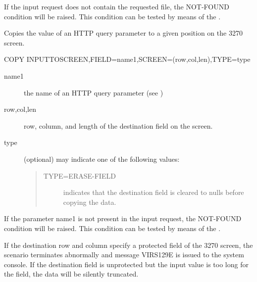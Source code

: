 \documentclass[letterpaper,10pt,english]{sphinxmanual}
\begin{document}
If the input request does not contain the requested file, the NOT-FOUND condition will be raised. This condition can be tested by means of the {\hyperref[\detokenize{User_Guide:v457ug-if}]{}}.


Copies the value of an HTTP query parameter to a given position on the 3270 screen.

\begin{sphinxVerbatim}[commandchars=\\\{\}]
COPY\PYGZdl{} INPUT\PYGZhy{}TO\PYGZhy{}SCREEN,FIELD=\PYGZsq{}name1\PYGZsq{},SCREEN=(row,col,len),TYPE=type
\end{sphinxVerbatim}
\begin{description}
\item[{name1}] \leavevmode
the name of an HTTP query parameter (see {\hyperref[\detokenize{User_Guide:v457ug-url-formats}]{}})

\item[{row,col,len}] \leavevmode
row, column, and length of the destination field on the screen.

\item[{type}] \leavevmode
(optional) may indicate one of the following values:
\begin{quote}
\begin{description}
\item[{TYPE=ERASE-FIELD}] \leavevmode
indicates that the destination field is cleared to nulls before copying the data.

\end{description}
\end{quote}

\end{description}

If the parameter name1 is not present in the input request, the NOT-FOUND condition will be raised. This condition can be tested by means of the {\hyperref[\detokenize{User_Guide:v457ug-if}]{}}.

If the destination row and column specify a protected field of the 3270 screen, the scenario terminates abnormally and message VIRS129E is issued to the system console. If the destination field is unprotected but the input value is too long for the field, the data will be silently truncated.
\end{document}
